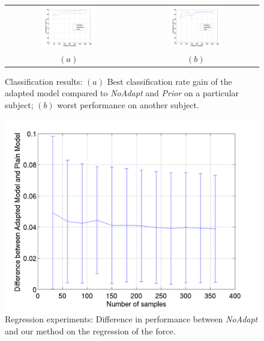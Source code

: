 \begin{figure}[ht] \centering
  \begin{tabular}{cc}
    \includegraphics[width=0.45\textwidth]{figs/exp1_abs_best} &
    \includegraphics[width=0.45\textwidth]{figs/exp1_abs_worst} \\
    $(a)$ & $(b)$ \\
  \end{tabular}
  \caption{Classification results: $(a)$ Best classification rate gain of the adapted model compared to
 \emph{NoAdapt} and \emph{Prior} on a particular subject; $(b)$ worst performance on another subject.}
  \label{fig:cla_abs}
\end{figure}

\begin{figure}[ht]
  \centering
  \includegraphics[width=0.95\linewidth]{figs/exp2}
  \caption{Regression experiments: Difference in performance between \emph{NoAdapt} and our method  on the
 regression of the force.}
  \label{fig:diff_reg}
\end{figure}

